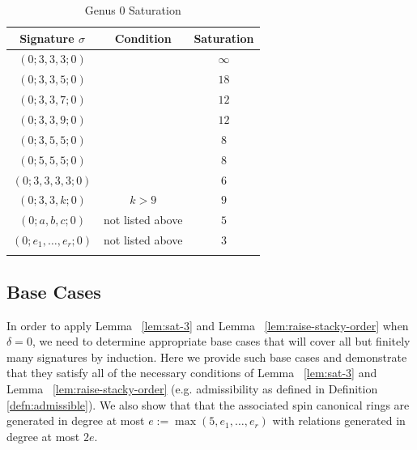 \documentclass{amsart}
\theoremstyle{plain}
\theoremstyle{definition}
\theoremstyle{remark}
\numberwithin{equation}{section}
\newcommand\ssec{\subsection}
\begin{document}
\begin{longtable}
	{| c | c || c |}
	\hline
	Signature $\sigma$ & Condition & Saturation \\
	\hline
	\hline

	$(0; 3, 3, 3; 0)$ & & $\infty$ \\	\hline

	$(0; 3, 3, 5; 0)$ & & $18$ \\	\hline
	
	$(0; 3, 3, 7; 0)$ & & $12$ \\	\hline
	
	$(0; 3, 3, 9; 0)$ & & $12$ \\	\hline
	
	$(0; 3, 5, 5; 0)$ & & $8$ \\	\hline
	
	$(0; 5, 5, 5; 0)$ & & $8$ \\	\hline
	
	$(0; 3, 3, 3, 3; 0)$ & & $6$ \\	\hline
	
	\hline
	\hline
	
	$(0; 3, 3, k; 0)$ & $k > 9$ & $9$ \\	\hline
	
	$(0; a, b, c; 0)$ & not listed above & $5$ \\	\hline
	
	$(0; e_1, \ldots, e_r; 0)$ & not listed above & $3$ \\	\hline
	
	\caption{Genus 0 Saturation}
	\label{table:g-0-sat}
\end{longtable}

\ssec{Base Cases}
\label{ssec:g-0_base}
In order to apply Lemma ~\ref{lem:sat-3} and Lemma
~\ref{lem:raise-stacky-order} when $\delta = 0$,
we need to determine appropriate base cases that will
cover all but finitely many signatures by induction.
Here we provide such base cases and demonstrate that
they satisfy all of the necessary conditions of
Lemma ~\ref{lem:sat-3} and Lemma ~\ref{lem:raise-stacky-order}
(e.g. admissibility as defined in Definition \ref{defn:admissible}). We also show that that the associated spin
canonical rings are generated in degree at most $e := \max(5, e_1,
\ldots, e_r)$ with relations generated in degree at most $2e$.
\end{document}
